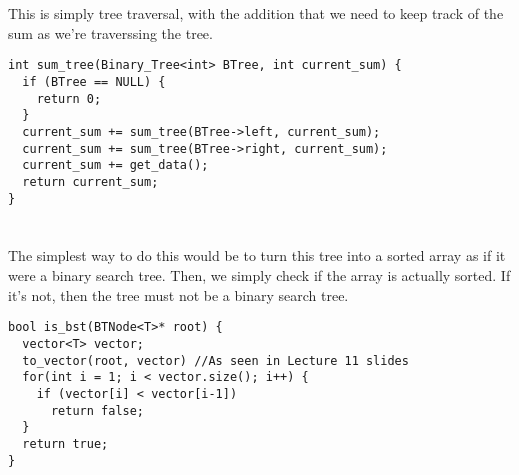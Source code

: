 \documentclass[12pt]{article}
\begin{document}
\section{}
This is simply tree traversal, with the addition that we need to keep track of the sum as we're traverssing the tree.\\

\begin{verbatim}
int sum_tree(Binary_Tree<int> BTree, int current_sum) {
  if (BTree == NULL) {
    return 0;
  }
  current_sum += sum_tree(BTree->left, current_sum);
  current_sum += sum_tree(BTree->right, current_sum);
  current_sum += get_data();
  return current_sum;
}
\end{verbatim}

\section{}
The simplest way to do this would be to turn this tree into a sorted array as if it were a binary search tree. Then, we simply check if the array is actually sorted. If it's not, then the tree must not be a binary search tree.\\

\begin{verbatim}
bool is_bst(BTNode<T>* root) {
  vector<T> vector;
  to_vector(root, vector) //As seen in Lecture 11 slides
  for(int i = 1; i < vector.size(); i++) {
    if (vector[i] < vector[i-1])
      return false;
  }
  return true;
}
\end{verbatim}
\end{document}
